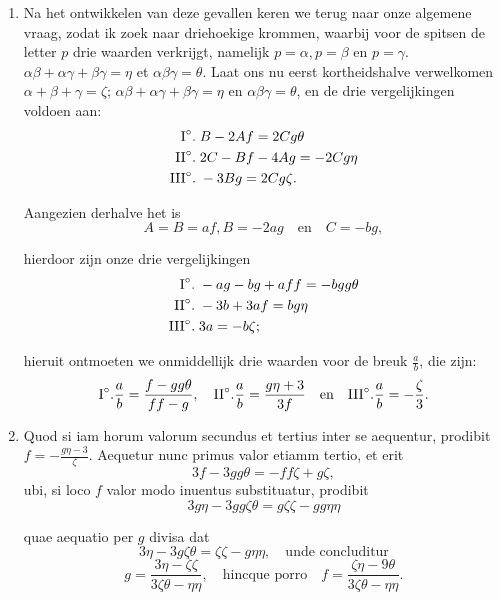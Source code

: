 \documentclass[10pt,a4paper]{article}
\newcommand{\switchenum}{\setcounter{enumi}{\arabic{enumi}-1}\switchcolumn}
\begin{document}
\begin{paracol}{2}
\begin{enumerate}[topsep=1px]
		\switchenum
		\item Na het ontwikkelen van deze gevallen keren we terug naar onze algemene vraag, zodat ik zoek naar driehoekige krommen, waarbij voor de spitsen de letter $p$ drie waarden verkrijgt, namelijk $p=\alpha, p=\beta$ en $p=\gamma$. $\alpha\beta + \alpha \gamma + \beta \gamma = \eta$ et $\alpha \beta \gamma = \theta$. Laat ons nu eerst kortheidshalve verwelkomen  $\alpha+\beta+\gamma = \zeta$; $\alpha\beta + \alpha \gamma + \beta \gamma = \eta$ en $\alpha \beta \gamma = \theta$, en de drie vergelijkingen voldoen aan:
		\begin{align*}
			\text{I}\degree. \;&B -2Af = 2Cg\theta\\
			\text{II}\degree. \;& 2C-Bf-4Ag = -2Cg\eta\\
			\text{III}\degree. \;& -3Bg = 2Cg\zeta.
		\end{align*}
		\par Aangezien derhalve het is
		\[
			A=B=af, B=-2ag \quad\text{en}\quad C= -bg,
		\]
		\par hierdoor zijn onze drie vergelijkingen
		\begin{align*}
			\text{I}\degree. \;& -ag -bg+aff = -bgg\theta\\
			\text{II}\degree. \;& -3b +3af = bg\eta\\
			\text{III}\degree. \;& 3a=-b\zeta;		
		\end{align*}
		\par hieruit ontmoeten we onmiddellijk drie waarden voor de breuk $\frac{a}{b}$, die zijn:
		\[
			\text{I}\degree. \frac{a}{b} = \frac{f-gg\theta}{ff-g},\quad  \text{II}\degree. \frac{a}{b} = \frac{g\eta + 3}{3f} \quad \text{en}\quad \text{III}\degree. \frac{a}{b} = -\frac{\zeta}{3}.
		\]
		
		\switchcolumn*
		
		\item Quod si iam horum valorum secundus et tertius inter se aequentur, prodibit $f=-\frac{g\eta -3 }{\zeta}$. Aequetur nunc primus valor etiamm tertio, et erit
		\[
			3f-3gg\theta = -ff \zeta + g \zeta,
		\]
		ubi, si loco $f$ valor modo inuentus substituatur, prodibit
		\[
			3g\eta -3gg\zeta \theta = g\zeta \zeta - gg\eta \eta
		\]
		\par quae aequatio per $g$ divisa dat
		\[
			3\eta - 3g\zeta \theta = \zeta \zeta - g\eta \eta, \quad \text{unde concluditur}
		\]
		\[
			g= \frac{3\eta - \zeta \zeta}{3\zeta \theta - \eta \eta}, \quad \text{hincque porro} \quad f = \frac{\zeta \eta - 9\theta}{3\zeta \theta - \eta \eta}.
		\]
		

\end{enumerate}
\end{paracol}
\end{document}
